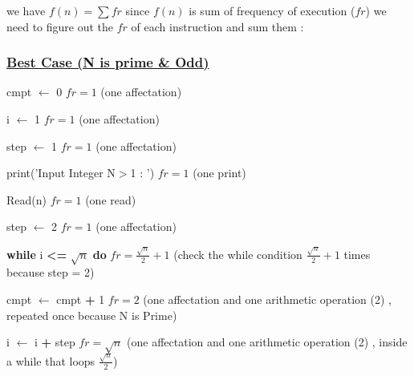 we have \(f(n) = \sum fr\) since \(f(n)\) is sum of frequency of execution (\(fr\)) we need to figure out the
\(fr\) of each instruction and sum them : 

\subsubsection*{\underline{Best Case (N is prime \& Odd)}}

cmpt $\gets$ 0  \hspace{4cm} \(fr = 1\) (one affectation)

\vspace{0.15cm}
i $\gets$ 1  \hspace{4.65cm} \(fr = 1\) (one affectation)

\vspace{0.15cm}
step $\gets$ 1  \hspace{4.1cm} \(fr = 1\) (one affectation)


\vspace{0.15cm}
\textcolor{purplePlot!80!black}{print}(\textcolor{blueArea!60!black}{'Input Integer N\(>\)1 : '})  \hspace{0.95cm} \(fr = 1\) (one print)

\vspace{0.15cm}
\textcolor{purplePlot!80!black}{Read}(n)  \hspace{4.25cm} \(fr = 1\) (one read)

\vspace{0.15cm}
step $\gets$ 2  \hspace{4.1cm} \(fr = 1\) (one affectation)


\vspace{0.15cm}

\textbf{while} i \textcolor{redPlot}{\textbf{\textless=}} \(\sqrt{n}\)  \textbf{do} \hspace{2.45cm} \(fr = \frac{\sqrt{n}}{2}+1\) (check the while condition \(\frac{\sqrt{n}}{2}+1\) times because step = 2)


\vspace{0.15cm}
cmpt $\gets$ cmpt \textcolor{redPlot}{ \textbf{+}} 1 \hspace{2.6cm} \(fr = 2\) (one affectation and one arithmetic operation (2) , repeated once because N is Prime)

\vspace{0.15cm}
i $\gets$ i \textcolor{redPlot}{ \textbf{+}} step \hspace{3.5cm} \(fr = \sqrt{n}\) (one affectation and one arithmetic operation (2) , inside a while that loops \(\frac{\sqrt{n}}{2}\))

